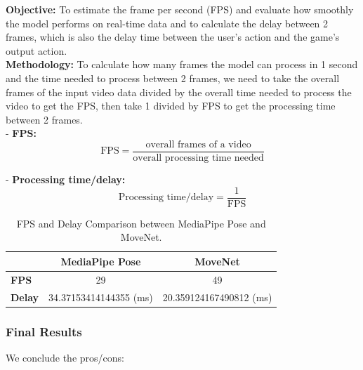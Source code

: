 \documentclass[12pt]{article}
\begin{document}
\hspace*{1.5em}\textbf{Objective:} To estimate the frame per second (FPS) and evaluate how smoothly the model performs on real-time data and to calculate the delay between 2 frames, which is also the delay time between the user’s action and the game’s output action.\\

\textbf{Methodology:} To calculate how many frames the model can process in 1 second and the time needed to process between 2 frames, we need to take the overall frames of the input video data divided by the overall time needed to process the video to get the FPS, then take 1 divided by FPS to get the processing time between 2 frames.\\

- \textbf{FPS:}
\[
    \text{FPS} = \frac{\text{overall frames of a video}}{\text{overall processing time needed}}
\]

- \textbf{Processing time/delay:}
\[
    \text{Processing time/delay} = \frac{1}{\text{FPS}}
\]

\begin{table}[h]
    \centering
    \caption{FPS and Delay Comparison between MediaPipe Pose and MoveNet.}
    \begin{tabular}{|l|c|c|}
    \hline
     & \textbf{MediaPipe Pose} & \textbf{MoveNet} \\
     \hline
    \textbf{FPS} & 29 & 49 \\
    \hline
    \textbf{Delay} & 34.37153414144355 (ms) & 20.359124167490812 (ms) \\
    \hline    
    \end{tabular}
    \end{table}
    
    \subsubsection{Final Results}
    We conclude the pros/cons:
    
\end{document}
